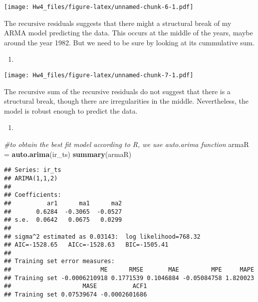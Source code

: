 \documentclass[]{article}
\newenvironment{Shaded}{\begin{snugshade}}{\end{snugshade}}
\newcommand{\KeywordTok}[1]{\textcolor[rgb]{0.13,0.29,0.53}{\textbf{#1}}}
\newcommand{\DataTypeTok}[1]{\textcolor[rgb]{0.13,0.29,0.53}{#1}}
\newcommand{\DecValTok}[1]{\textcolor[rgb]{0.00,0.00,0.81}{#1}}
\newcommand{\StringTok}[1]{\textcolor[rgb]{0.31,0.60,0.02}{#1}}
\newcommand{\CommentTok}[1]{\textcolor[rgb]{0.56,0.35,0.01}{\textit{#1}}}
\newcommand{\OperatorTok}[1]{\textcolor[rgb]{0.81,0.36,0.00}{\textbf{#1}}}
\newcommand{\NormalTok}[1]{#1}
\begin{document}
\texttt{[image: Hw4\_files/figure-latex/unnamed-chunk-6-1.pdf]}

The recursive residuals suggests that there might a structural break of
my ARMA model predicting the data. This occurs at the middle of the
years, maybe around the year 1982. But we need to be sure by looking at
its cummulative sum.

\begin{enumerate}
\def\labelenumi{\alph{enumi})}
\setcounter{enumi}{4}
\item
\end{enumerate}

\begin{Shaded}
\end{Shaded}

\texttt{[image: Hw4\_files/figure-latex/unnamed-chunk-7-1.pdf]}

The recursive sum of the recursive residuals do not suggest that there
is a structural break, though there are irregularities in the middle.
Nevertheless, the model is robust enough to predict the data.

\begin{enumerate}
\def\labelenumi{\alph{enumi})}
\setcounter{enumi}{3}
\item
\end{enumerate}

\begin{Shaded}
\begin{Highlighting}[]
\CommentTok{#to obtain the best fit model according to R, we use auto.arima function}
\NormalTok{armaR =}\StringTok{ }\KeywordTok{auto.arima}\NormalTok{(ir_ts)}
\KeywordTok{summary}\NormalTok{(armaR)}
\end{Highlighting}
\end{Shaded}

\begin{verbatim}
## Series: ir_ts 
## ARIMA(1,1,2) 
## 
## Coefficients:
##          ar1      ma1      ma2
##       0.6284  -0.3065  -0.0527
## s.e.  0.0642   0.0675   0.0299
## 
## sigma^2 estimated as 0.03143:  log likelihood=768.32
## AIC=-1528.65   AICc=-1528.63   BIC=-1505.41
## 
## Training set error measures:
##                         ME      RMSE       MAE         MPE     MAPE
## Training set -0.0006210918 0.1771539 0.1046884 -0.05084758 1.820023
##                    MASE          ACF1
## Training set 0.07539674 -0.0002601686
\end{verbatim}
\end{document}
